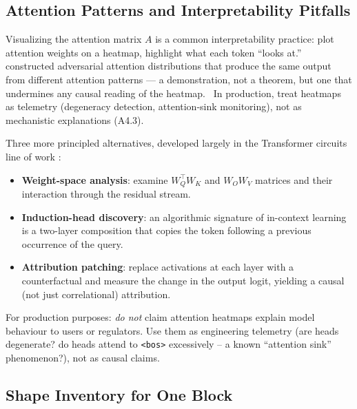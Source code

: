 \subsection{Attention Patterns and Interpretability Pitfalls}

Visualizing the attention matrix $A$ is a common interpretability
practice: plot attention weights on a heatmap, highlight what each
token ``looks at.'' \Emp\ \citet{jain2019attention} constructed
adversarial attention distributions that produce the same output
from different attention patterns --- a demonstration, not a
theorem, but one that undermines any causal reading of the heatmap.
\Heur\ In production, treat heatmaps as telemetry (degeneracy
detection, attention-sink monitoring), not as mechanistic
explanations (A4.3).

Three more principled alternatives, developed largely in the
Transformer circuits line of work
\citep{elhage2021mathematical, olsson2022induction}:
\begin{itemize}
  \item \textbf{Weight-space analysis}: examine
        $W_Q^{\top} W_K$ and $W_O W_V$ matrices and their interaction
        through the residual stream.
  \item \textbf{Induction-head discovery}: an algorithmic signature
        of in-context learning is a two-layer composition that copies
        the token following a previous occurrence of the query.
  \item \textbf{Attribution patching}: replace activations at each
        layer with a counterfactual and measure the change in the
        output logit, yielding a causal (not just correlational)
        attribution.
\end{itemize}
For production purposes: \emph{do not} claim attention heatmaps
explain model behaviour to users or regulators. Use them as
engineering telemetry (are heads degenerate? do heads attend to
\texttt{<bos>} excessively -- a known ``attention sink'' phenomenon?),
not as causal claims.

\subsection{Shape Inventory for One Block}

